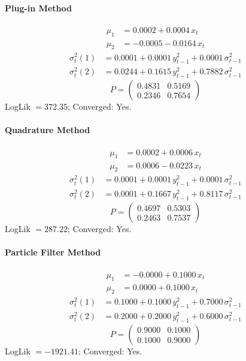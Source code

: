 \documentclass[11pt, a4paper]{article}
\begin{document}
\paragraph{Plug-in Method}
\begin{align}
\mu_{1} &= 0.0002 + 0.0004\, x_t \\
\mu_{2} &= -0.0005 -0.0164\, x_t
\end{align}
\begin{align}
\sigma^2_{t}(1) &= 0.0001 + 0.0001\, y_{t-1}^2 + 0.0001\, \sigma^2_{t-1} \\
\sigma^2_{t}(2) &= 0.0244 + 0.1615\, y_{t-1}^2 + 0.7882\, \sigma^2_{t-1}
\end{align}
\begin{equation}
P = \begin{pmatrix} 0.4831 & 0.5169 \\ 0.2346 & 0.7654 \end{pmatrix}
\end{equation}
LogLik $= 372.35$; Converged: Yes.

\paragraph{Quadrature Method}
\begin{align}
\mu_{1} &= 0.0002 + 0.0006\, x_t \\
\mu_{2} &= 0.0006 -0.0223\, x_t
\end{align}
\begin{align}
\sigma^2_{t}(1) &= 0.0001 + 0.0001\, y_{t-1}^2 + 0.0001\, \sigma^2_{t-1} \\
\sigma^2_{t}(2) &= 0.0001 + 0.1667\, y_{t-1}^2 + 0.8117\, \sigma^2_{t-1}
\end{align}
\begin{equation}
P = \begin{pmatrix} 0.4697 & 0.5303 \\ 0.2463 & 0.7537 \end{pmatrix}
\end{equation}
LogLik $= 287.22$; Converged: Yes.

\paragraph{Particle Filter Method}
\begin{align}
\mu_{1} &= -0.0000 + 0.1000\, x_t \\
\mu_{2} &= 0.0000 + 0.1000\, x_t
\end{align}
\begin{align}
\sigma^2_{t}(1) &= 0.1000 + 0.1000\, y_{t-1}^2 + 0.7000\, \sigma^2_{t-1} \\
\sigma^2_{t}(2) &= 0.2000 + 0.2000\, y_{t-1}^2 + 0.6000\, \sigma^2_{t-1}
\end{align}
\begin{equation}
P = \begin{pmatrix} 0.9000 & 0.1000 \\ 0.1000 & 0.9000 \end{pmatrix}
\end{equation}
LogLik $= -1921.41$; Converged: Yes.
\end{document}
